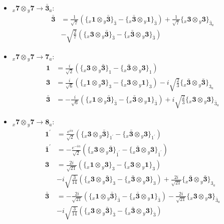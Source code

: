 \documentclass[english]{article}
\newcommand{\rep}[1]{\mathbf{#1}}
\newcommand{\repx}[2]{{}_{#2}\mathbf{#1}}
\newcommand{\subcg}[3]{\big\{ \repx{#1}{x}\otimes\repx{#2}{y}\big\}^{}_{#3}}
\begin{document}
\begin{itemize}
\begin{align*}
\end{align*}
\item $\repx{7}{x}\otimes\repx{7}{y}\to\rep{\bar{3}}_{a}$:
\begin{align*}
\rep{\bar{3}} & = \frac{1}{\sqrt{7}}\left(\subcg{1}{\bar{3}}{\bar{3}}-\subcg{\bar{3}}{1}{\bar{3}}\right)+\frac{1}{\sqrt{7}}\subcg{3}{3}{\bar{3}_{a}} \\ 
 & -\sqrt{\frac{2}{7}}\left(\subcg{3}{\bar{3}}{\bar{3}}-\subcg{\bar{3}}{3}{\bar{3}}\right)
\end{align*}
\item $\repx{7}{x}\otimes\repx{7}{y}\to\rep{7}_{a}$:
\begin{align*}
\rep{1} & = \frac{i}{\sqrt{2}}\left(\subcg{3}{\bar{3}}{1}-\subcg{\bar{3}}{3}{1}\right)
\\
\rep{3} & = \frac{i}{\sqrt{6}}\left(\subcg{1}{3}{3}-\subcg{3}{1}{3}\right)-i \sqrt{\frac{2}{3}}\subcg{\bar{3}}{\bar{3}}{3_{a}}
\\
\rep{\bar{3}} & = -\frac{i}{\sqrt{6}}\left(\subcg{1}{\bar{3}}{\bar{3}}-\subcg{\bar{3}}{1}{\bar{3}}\right)+i \sqrt{\frac{2}{3}}\subcg{3}{3}{\bar{3}_{a}}
\end{align*}
\item $\repx{7}{x}\otimes\repx{7}{y}\to\rep{8}_{a}$:
\begin{align*}
\rep{1^{\prime}} & = \frac{e^{i \alpha }}{\sqrt{2}}\left(\subcg{3}{\bar{3}}{1^{\prime}}-\subcg{\bar{3}}{3}{1^{\prime}}\right)
\\
\rep{\bar{1}^{\prime}} & = -\frac{e^{-i \alpha }}{\sqrt{2}}\left(\subcg{3}{\bar{3}}{\bar{1}^{\prime}}-\subcg{\bar{3}}{3}{\bar{1}^{\prime}}\right)
\\
\rep{3} & = \frac{2 i}{\sqrt{21}}\left(\subcg{1}{3}{3}-\subcg{3}{1}{3}\right) \\ 
 & -i \sqrt{\frac{3}{14}}\left(\subcg{3}{\bar{3}}{3}-\subcg{\bar{3}}{3}{3}\right)+\frac{2 i}{\sqrt{21}}\subcg{\bar{3}}{\bar{3}}{3_{a}}
\\
\rep{\bar{3}} & = -\frac{2 i}{\sqrt{21}}\left(\subcg{1}{\bar{3}}{\bar{3}}-\subcg{\bar{3}}{1}{\bar{3}}\right)-\frac{2 i}{\sqrt{21}}\subcg{3}{3}{\bar{3}_{a}} \\ 
 & -i \sqrt{\frac{3}{14}}\left(\subcg{3}{\bar{3}}{\bar{3}}-\subcg{\bar{3}}{3}{\bar{3}}\right)
\end{align*}
\end{itemize}
\end{document}
